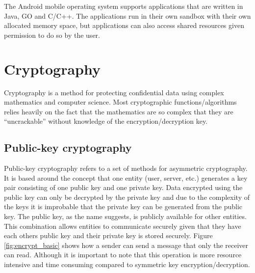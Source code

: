 The Android mobile operating system supports applications that are written in Java, GO and C/C++. The applications run in their own sandbox with their own allocated memory space, but applications can also access shared resources given permission to do so by the user.

\section{Cryptography}
Cryptography is a method for protecting confidential data using complex mathematics and computer science. Most cryptographic functions/algorithms relies heavily on the fact that the mathematics are so complex that they are ``uncrackable'' without knowledge of the encryption/decryption key.

\subsection{Public-key cryptography}
\label{sec:publicKeyCrypto}
Public-key cryptography refers to a set of methods for asymmetric cryptography. It is based around the concept that one entity (user, server, etc.) generates a key pair consisting of one public key and one private key. Data encrypted using the public key can only be decrypted by the private key and due to the complexity of the keys it is improbable that the private key can be generated from the public key. The public key, as the name suggests, is publicly available for other entities. This combination allows entities to communicate securely given that they have each others public key and their private key is stored securely. Figure \ref{fig:encrypt_basic} shows how a sender can send a message that only the receiver can read. Although it is important to note that this operation is more resource intensive and time consuming compared to symmetric key encryption/decryption.

